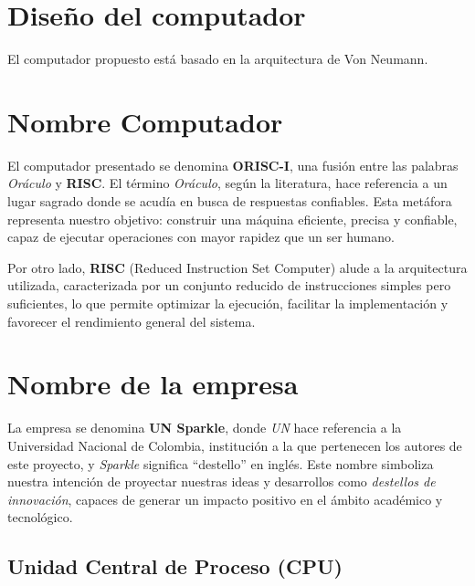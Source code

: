 \documentclass{article}
\begin{document}

\section{Diseño del computador}

El computador propuesto está basado en la arquitectura de Von Neumann.

\section{Nombre Computador}

El computador presentado se denomina \textbf{ORISC-I}, una fusión entre las 
palabras \textit{Oráculo} y \textbf{RISC}. El término \textit{Oráculo}, según 
la literatura, hace referencia a un lugar sagrado donde se acudía en busca de 
respuestas confiables. Esta metáfora representa nuestro objetivo: construir una 
máquina eficiente, precisa y confiable, capaz de ejecutar operaciones con mayor 
rapidez que un ser humano.

Por otro lado, \textbf{RISC} (Reduced Instruction Set Computer) alude a la 
arquitectura utilizada, caracterizada por un conjunto reducido de instrucciones 
simples pero suficientes, lo que permite optimizar la ejecución, facilitar la 
implementación y favorecer el rendimiento general del sistema.

\section{Nombre de la empresa}

La empresa se denomina \textbf{UN Sparkle}, donde \textit{UN} hace referencia a 
la Universidad Nacional de Colombia, institución a la que pertenecen los autores 
de este proyecto, y \textit{Sparkle} significa “destello” en inglés. Este nombre 
simboliza nuestra intención de proyectar nuestras ideas y desarrollos como 
\textit{destellos de innovación}, capaces de generar un impacto positivo en 
el ámbito académico y tecnológico.


\subsection{Unidad Central de Proceso (CPU)}
\end{document}
